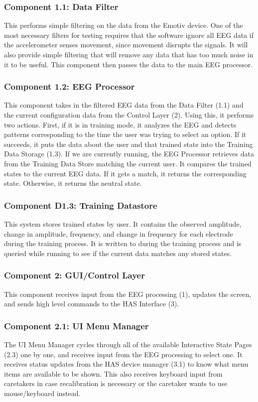 \documentclass{article}
\begin{document}
\subsubsection{Component 1.1: Data Filter}
This performs simple filtering on the data from the Emotiv device. One of
the most necessary filters for testing requires that the software ignore all
EEG data if the accelerometer senses movement, since movement disrupts the
signals. It will also provide simple filtering that will remove any data
that has too much noise in it to be useful. This component then passes the
data to the main EEG processor.

\subsubsection{Component 1.2: EEG Processor}
This component takes in the filtered EEG data from the Data Filter (1.1) and
the current configuration data from the Control Layer (2). Using this, it
performs two actions. First, if it is in training mode, it analyzes the EEG
and detects patterns corresponding to the time the user was trying to select
an option. If it succeeds, it puts the data about the user and that trained
state into the Training Data Storage (1.3). If we are currently running, the
EEG Processor retrieves data from the Training Data Store matching the current
user. It compares the trained states to the current EEG data. If it gets a
match, it returns the corresponding state. Otherwise, it returns the neutral
state.

\subsubsection{Component D1.3: Training Datastore}
This system stores trained states by user. It contains the observed amplitude,
change in amplitude, frequency, and change in frequency for each electrode
during the training process. It is written to during the training process and
is queried while running to see if the current data matches any stored states.

\subsubsection{Component 2: GUI/Control Layer}
This component receives input from the EEG processing (1), updates the screen,
and sends high level commands to the HAS Interface (3). 

\subsubsection{Component 2.1: UI Menu Manager}
The UI Menu Manager cycles through all of the available Interactive State Pages (2.3) one by one, and receives input from the EEG processing to select one. It receives status updates from the HAS device manager (3.1) to know what menu items are available to be shown. This also receives keyboard input from caretakers in case recalibration is necessary or the caretaker wants to use mouse/keyboard instead.
\end{document}
